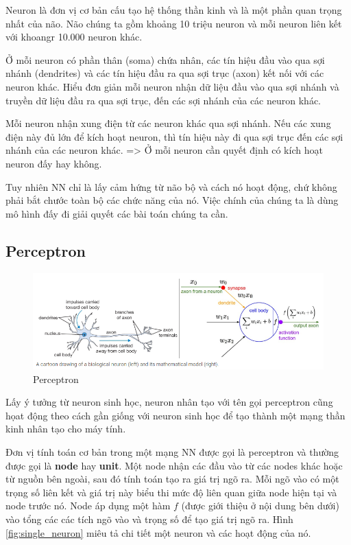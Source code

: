 Neuron là đơn vị cơ bản cấu tạo hệ thống thần kinh và là một phần quan trọng nhất của não. Não chúng ta gồm khoảng 10 triệu neuron và mỗi neuron liên kết với khoangr 10.000 neuron khác.

Ở mỗi neuron có phần thân (soma) chứa nhân, các tín hiệu đầu vào qua sợi nhánh (dendrites) và các tín hiệu đầu ra qua sợi trục (axon) kết nối với các neuron khác. Hiểu đơn giản mỗi neuron nhận dữ liệu đầu vào qua sợi nhánh và truyền dữ liệu đầu ra qua sợi trục, đến các sợi nhánh của các neuron khác.

Mỗi neuron nhận xung điện từ các neuron khác qua sợi nhánh. Nếu các xung điện này đủ lớn để kích hoạt neuron, thì tín hiệu này đi qua sợi trục đến các sợi nhánh của các neuron khác. => Ở mỗi neuron cần quyết định có kích hoạt neuron đấy hay không.

Tuy nhiên NN chỉ là lấy cảm hứng từ não bộ và cách nó hoạt động, chứ không phải bắt chước toàn bộ các chức năng của nó. Việc chính của chúng ta là dùng mô hình đấy đi giải quyết các bài toán chúng ta cần.

\subsection{Perceptron}
\label{s:perceptron}
\FloatBarrier
\begin{figure}[htp]
\begin{center}
\includegraphics[scale=0.6]{chap2/c2_figs/perceptron.PNG}
\end{center}
\caption{Perceptron}
\label{fig:perceptron}
\end{figure}
\FloatBarrier

Lấy ý tưởng từ neuron sinh học, neuron nhân tạo với tên gọi perceptron cũng họat động theo cách gần giống với neuron sinh học để tạo thành một mạng thần kinh nhân tạo cho máy tính.

Đơn vị tính toán cơ bản trong một mạng NN được gọi là perceptron và thường được gọi là \textbf{node} hay \textbf{unit}. Một node nhận các đầu vào từ các nodes khác hoặc từ nguồn bên ngoài, sau đó tính toán tạo ra giá trị ngõ ra. Mỗi ngõ vào có một trọng số liên kết và giá trị này biểu thi mức độ liên quan giữa node hiện tại và node trước nó. Node áp dụng một hàm $f$ (được giới thiệu ở nội dung bên dưới) vào tổng các các tích ngõ vào và trọng số để tạo giá trị ngõ ra. Hình \ref{fig:single_neuron} miêu tả chi tiết một neuron và các hoạt động của nó.

